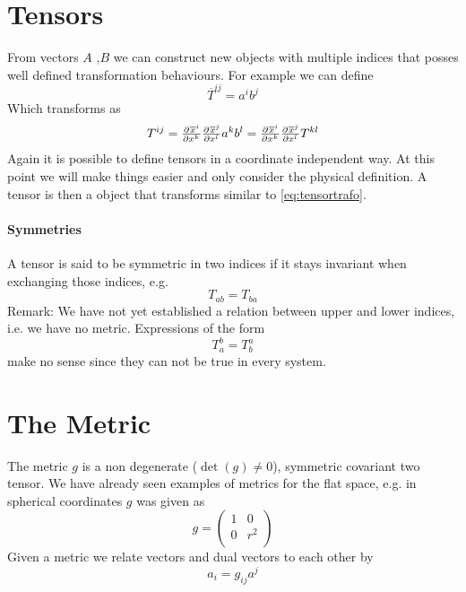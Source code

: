 \documentclass[
    a4paper,                                               %
    oneside,                                               %
    12pt,                                                  %
    headsepline,                                           %
    xcolor=dvipsnames
    ]{scrreprt}
\theoremstyle{definition}
\theoremstyle{remark}
\begin{document}
	     \section{Tensors}
	     From vectors $A$ ,$B$ we can construct new objects with multiple indices that posses well defined transformation behaviours. For example we can define 
	    \begin{equation}
	    \overline{T}^{ij}=a^ib^j
	    \end{equation}	   
	     Which transforms as 
		\begin{equation}
		T^{ij}=\pd{\overline{x}^i}{{x^k}}\pd{\overline{x}^j}{{x^l}}a^kb^l=\pd{\overline{x}^i}{{x^k}}\pd{\overline{x}^j}{{x^l}}T^{kl}\label{eq:tensortrafo}
		\end{equation}
		Again it is possible to define tensors in a coordinate independent way. At this point we will make things easier and only consider the physical definition. A tensor is then a object that transforms similar to \eqref{eq:tensortrafo}. 
		\paragraph{Symmetries}
		A tensor is said to be symmetric in two indices if it stays invariant when exchanging those indices, e.g.
		\begin{equation}
			T_{ab}=T_{ba}
		\end{equation}
		Remark: We have not yet established a relation between upper and lower indices, i.e. we have no metric. Expressions of the form 
		\begin{equation}
			T_a^b=T_b^a
		\end{equation}
		make no sense since they can not be true in every system.
		\section{The Metric}
		The metric $g$ is a non degenerate ($\det(g)\neq 0$), symmetric covariant two tensor. We have already seen examples of metrics for the flat space, e.g. in spherical coordinates $g$ was given as 
		\begin{equation}
			g=\begin{pmatrix}
			1 & 0\\
			0 & r^2\\
			\end{pmatrix}
		\end{equation} 
		Given a metric we relate vectors and dual vectors to each other by
		\begin{equation}
			a_i=g_{ij}a^j
		\end{equation} 
\end{document}
